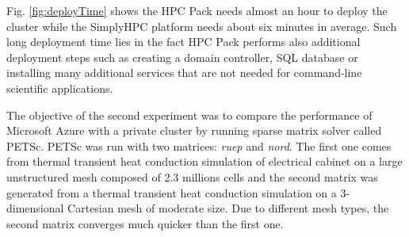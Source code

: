 \documentclass[3p,times]{elsarticle}
\begin{document}
Fig. \ref{fig:deployTime} shows the HPC Pack needs almost an hour to deploy the cluster while the SimplyHPC platform needs about six minutes in average. Such long deployment time lies in the fact HPC Pack performs also additional deployment steps such as creating a domain controller, SQL database or installing many additional services that are not needed for command-line scientific applications.

The objective of the second experiment was to compare the performance of Microsoft Azure with a private cluster by running sparse matrix solver called PETSc. PETSc was run with two matrices: \textit{ruep} and \textit{nord}. The first one comes from thermal transient heat conduction simulation of electrical cabinet on a large unstructured mesh composed of 2.3 millions cells and the second matrix was generated from a thermal transient heat conduction simulation on a 3-dimensional Cartesian mesh of moderate size. Due to different mesh types, the second matrix converges much quicker than the first one. 

\end{document}
